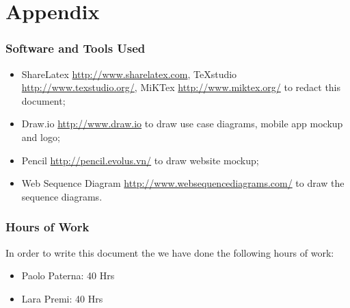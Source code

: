 \section{Appendix}
\subsubsection{Software and Tools Used}
	\begin{itemize}
		\item ShareLatex \url{http://www.sharelatex.com}, TeXstudio \url{http://www.texstudio.org/}, MiKTex \url{http://www.miktex.org/} to redact this document;
		\item Draw.io \url{http://www.draw.io} to draw use case diagrams, mobile app mockup and logo;
		\item Pencil \url{http://pencil.evolus.vn/} to draw website mockup;
		\item Web Sequence Diagram \url{http://www.websequencediagrams.com/} to draw the sequence diagrams.
	\end{itemize}
\subsubsection{Hours of Work}
	In order to write this document the we have done the following hours of work:
	\begin{itemize}
		\item Paolo Paterna: 40 Hrs
		\item Lara Premi: 40 Hrs
	\end{itemize}